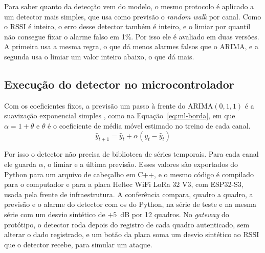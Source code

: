 Para saber quanto da detecção vem do modelo, o mesmo protocolo é aplicado a um
detector mais simples, que usa como previsão o \textit{random walk} por canal.
Como o RSSI é inteiro, o erro desse detector também é inteiro, e o limiar por
quantil não consegue fixar o alarme falso em 1\%. Por isso ele é avaliado em
duas versões. A primeira usa a mesma regra, o que dá menos alarmes falsos que o
ARIMA, e a segunda usa o limiar um valor inteiro abaixo, o que dá mais.

\subsection{Execução do detector no microcontrolador}
\label{subsec:ml-protocolo-borda}

Com os coeficientes fixos, a previsão um passo à frente do ARIMA$(0,1,1)$ é a
suavização exponencial simples \cite{hyndman2021}, como na
Equação~\ref{eq:ml-borda}, em que $\alpha = 1 + \theta$ e $\theta$ é o
coeficiente de média móvel estimado no treino de cada canal.
\begin{equation}
	\hat{y}_{t+1} = \hat{y}_t + \alpha \left( y_t - \hat{y}_t \right)
	\label{eq:ml-borda}
\end{equation}

Por isso o detector não precisa de biblioteca de séries temporais. Para cada
canal ele guarda $\alpha$, o limiar e a última previsão. Esses valores são
exportados do Python para um arquivo de cabeçalho em C++, e o mesmo código é
compilado para o computador e para a placa Heltec WiFi LoRa 32 V3, com ESP32-S3,
usada pela frente de infraestrutura. A conferência compara, quadro a quadro,
a previsão e o alarme do detector com os do Python, na série de teste e na mesma
série com um desvio sintético de $+5$~dB por 12 quadros. No \textit{gateway} do
protótipo, o detector roda depois do registro de cada quadro autenticado, sem
alterar o dado registrado, e um botão da placa soma um desvio sintético ao RSSI
que o detector recebe, para simular um ataque.

